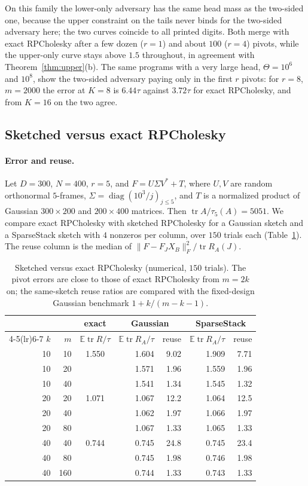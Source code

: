 \documentclass[11pt]{article}
\theoremstyle{definition}\newtheorem{definition}[theorem]{Definition}
\theoremstyle{remark}\newtheorem{remark}[theorem]{Remark}
\newcommand{\E}{\mathbb E}
\newcommand{\tr}{\operatorname{tr}}
\newcommand{\diag}{\operatorname{diag}}
\newcommand{\1}{\mathbf 1}
\begin{document}
On this family the lower-only adversary has the same head mass as the
two-sided one, because the upper constraint on the tails never binds
for the two-sided adversary here; the two curves coincide to all printed
digits. Both merge with exact RPCholesky after a few dozen ($r=1$) and
about $100$ ($r=4$) pivots, while the upper-only curve stays above $1.5$ throughout, in
agreement with Theorem~\ref{thm:upper}(b). The same programs with a very
large head, $\Theta=10^6$ and $10^8$, show the two-sided adversary paying
only in the first $r$ pivots: for $r=8$, $m=2000$ the error at $K=8$ is
$6.44\tau$ against $3.72\tau$ for exact RPCholesky, and from $K=16$ on
the two agree.
\subsection{Sketched versus exact RPCholesky}
\paragraph{Error and reuse.}
Let $D=300$, $N=400$, $r=5$, and $F=U\Sigma V^*+T$, where $U,V$ are
random orthonormal $5$-frames, $\Sigma=\diag(10^3/j)_{j\le5}$, and $T$
is a normalized product of Gaussian $300\times200$ and $200\times400$
matrices. Then $\tr A/\tau_5(A)=5051$. We compare exact RPCholesky
with sketched RPCholesky for a Gaussian sketch and a SparseStack sketch
with $4$ nonzeros per column, over $150$ trials each
(Table~\ref{tab:sk-err}). The reuse column is the median of
$\|F-F_JX_B\|_F^2/\tr R_A(J)$.

\begin{table}[ht]
\centering
\begin{tabular}{rrcrrrr}
\toprule
& & exact & \multicolumn{2}{c}{Gaussian} & \multicolumn{2}{c}{SparseStack}\\
\cmidrule(lr){4-5}\cmidrule(lr){6-7}
$k$ & $m$ & $\E\tr R/\tau$ & $\E\tr R_A/\tau$ & reuse & $\E\tr R_A/\tau$ & reuse\\
\midrule
10 & 10 & 1.550 & 1.604 & 9.02 & 1.909 & 7.71\\
10 & 20 &       & 1.571 & 1.96 & 1.559 & 1.96\\
10 & 40 &       & 1.541 & 1.34 & 1.545 & 1.32\\
20 & 20 & 1.071 & 1.067 & 12.2 & 1.064 & 12.5\\
20 & 40 &       & 1.062 & 1.97 & 1.066 & 1.97\\
20 & 80 &       & 1.067 & 1.33 & 1.065 & 1.33\\
40 & 40 & 0.744 & 0.745 & 24.8 & 0.745 & 23.4\\
40 & 80 &       & 0.745 & 1.98 & 0.746 & 1.98\\
40 & 160 &      & 0.744 & 1.33 & 0.743 & 1.33\\
\bottomrule
\end{tabular}
\caption{Sketched versus exact RPCholesky (numerical, $150$ trials).
The pivot errors are close to those of exact RPCholesky from $m=2k$
on; the same-sketch reuse ratios are compared with the fixed-design
Gaussian benchmark $1+k/(m-k-1)$.}
\label{tab:sk-err}
\end{table}
\end{document}
